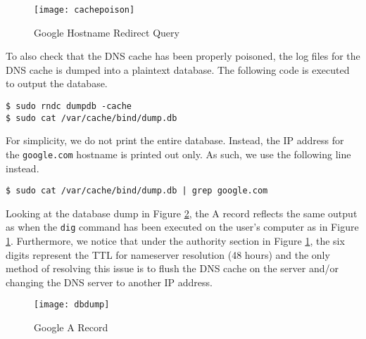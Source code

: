 \documentclass[a4paper,12pt]{article}
\begin{document}
\begin{figure}[H]
\centering
\texttt{[image: cachepoison]}
\caption{Google Hostname Redirect Query}
\label{fig:cachepoison}
\end{figure}
\noindent To also check that the DNS cache has been properly poisoned, the log files for the DNS cache is dumped into a plaintext database. The following code is executed to output the database.
\begin{verbatim}
$ sudo rndc dumpdb -cache
$ sudo cat /var/cache/bind/dump.db
\end{verbatim}
For simplicity, we do not print the entire database. Instead, the IP address for the \texttt{google.com} hostname is printed out only. As such, we use the following line instead.
\begin{verbatim}
$ sudo cat /var/cache/bind/dump.db | grep google.com
\end{verbatim}
Looking at the database dump in Figure \ref{fig:dbdump}, the A record reflects the same output as when the \texttt{dig} command has been executed on the user's computer as in Figure \ref{fig:cachepoison}. Furthermore, we notice that under the authority section in Figure \ref{fig:cachepoison}, the six digits represent the TTL for nameserver resolution (48 hours) and the only method of resolving this issue is to flush the DNS cache on the server and/or changing the DNS server to another IP address.
\begin{figure}[H]
\centering
\texttt{[image: dbdump]}
\caption{Google A Record}
\label{fig:dbdump}
\end{figure}
		
\end{document}
